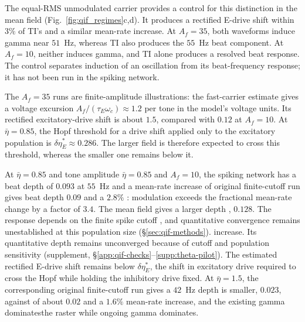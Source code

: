 \documentclass[11pt,a4paper]{article}
\providecommand{\DIFaddtex}[1]{{\protect\color{blue} \sf #1}} %
\providecommand{\DIFdeltex}[1]{{\protect\color{red} \scriptsize #1}} %
\providecommand{\DIFaddbegin}{} %
\providecommand{\DIFaddend}{} %
\providecommand{\DIFdelbegin}{} %
\providecommand{\DIFdelend}{} %
\providecommand{\DIFadd}[1]{\texorpdfstring{\DIFaddtex{#1}}{#1}} %
\providecommand{\DIFdel}[1]{\texorpdfstring{\DIFdeltex{#1}}{}} %
\begin{document}
\DIFdelbegin \DIFdel{The equal-RMS unmodulated carrier provides a control for this distinction in
the mean field (Fig.~\ref{fig:qif_regimes}c,d). It produces a rectified E-drive
shift within $3\%$ of TI's and a similar mean-rate increase. At $A_f=35$, both
waveforms induce gamma near $51$~Hz, whereas TI also produces the $55$~Hz beat
component. At $A_f=10$, neither induces gamma, and TI alone produces a resolved beat
response. The control separates induction of an oscillation from its
beat-frequency response; it has not been run in the spiking network.
}%

\DIFdel{The $A_f=35$ runs are finite-amplitude illustrations: the fast-carrier estimate gives a voltage excursion
$A_f/(\tau_E\omega_c)\approx1.2$ per tone in the model's voltage units. Its
rectified excitatory-drive shift is about $1.5$, compared with $0.12$ at
$A_f=10$. At $\bar\eta=0.85$, the Hopf threshold for a drive shift applied
only to the excitatory population is $\delta\eta_E^*\approx0.286$. The larger
field is therefore expected to cross this threshold, whereas the smaller one
remains below it.
}%

\DIFdelend At \DIFdelbegin \DIFdel{$\bar\eta=0.85$ and tone amplitude }\DIFdelend \DIFaddbegin \DIFadd{$\bar\eta=0.85$ and }\DIFaddend $A_f=10$, the \DIFdelbegin \DIFdel{spiking network has a beat depth of $0.093$ at $55$~Hz and a mean-rate increase of }\DIFdelend \DIFaddbegin \DIFadd{original finite-cutoff run gives
beat depth $0.09$ and a }\DIFaddend $2.8\%$ \DIFdelbegin \DIFdel{: modulation exceeds
the fractional }\DIFdelend mean-rate \DIFdelbegin \DIFdel{change by a factor of $3.4$. The mean field gives a
larger depth
, $0.128$. The response depends on the finite spike cutoff , and quantitative convergence
remains unestablished at this population size (\S\ref{sec:qif-methods}). }\DIFdelend \DIFaddbegin \DIFadd{increase. Its quantitative depth
remains unconverged because of cutoff and population sensitivity (supplement,
\S\ref{app:qif-checks}--\ref{supp:theta-pilot}). The estimated rectified
E-drive shift remains below $\delta\eta_E^*$, the shift in excitatory drive
required to cross the Hopf while holding the inhibitory drive fixed.
}\DIFaddend At $\bar\eta=1.5$, the \DIFdelbegin \DIFdel{corresponding }\DIFdelend \DIFaddbegin \DIFadd{original finite-cutoff run gives a }\DIFaddend $42$~Hz depth
\DIFdelbegin \DIFdel{is smaller, $0.023$, against }\DIFdelend \DIFaddbegin \DIFadd{of about $0.02$ and }\DIFaddend a $1.6\%$ mean-rate increase, \DIFdelbegin \DIFdel{and the existing gamma dominatesthe raster}\DIFdelend \DIFaddbegin \DIFadd{while ongoing gamma dominates}\DIFaddend .
\end{document}
